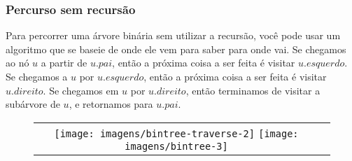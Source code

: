 \documentclass{beamer}
\begin{document}
\begin{frame}
\frametitle{Percurso sem recursão}
Para percorrer uma árvore binária sem utilizar a recursão, você pode usar um algoritmo que
se baseie de onde ele vem para saber para onde vai.  Se chegamos ao nó \ensuremath{\ensuremath{\ensuremath{\mathit{u}}}} a partir de \ensuremath{\ensuremath{\ensuremath{\mathit{u}}.\ensuremath{\mathit{pai}}}},
então a próxima coisa a ser feita é visitar \ensuremath{\ensuremath{\ensuremath{\mathit{u}}.\ensuremath{\mathit{esquerdo}}}}.  Se chegamos a \ensuremath{\ensuremath{\ensuremath{\mathit{u}}}}
por \ensuremath{\ensuremath{\ensuremath{\mathit{u}}.\ensuremath{\mathit{esquerdo}}}}, então a próxima coisa a ser feita é visitar \ensuremath{\ensuremath{\ensuremath{\mathit{u}}.\ensuremath{\mathit{direito}}}}.  Se chegamos 
em \ensuremath{\ensuremath{\ensuremath{\mathit{u}}}} por \ensuremath{\ensuremath{\ensuremath{\mathit{u}}.\ensuremath{\mathit{direito}}}}, então terminamos de visitar a subárvore de \ensuremath{\ensuremath{\ensuremath{\mathit{u}}}},
e retornamos para \ensuremath{\ensuremath{\ensuremath{\mathit{u}}.\ensuremath{\mathit{pai}}}}.
\begin{figure}
  \begin{center}
    \begin{tabular}{cc}
      \texttt{[image: imagens/bintree-traverse-2]}
      \texttt{[image: imagens/bintree-3]}
    \end{tabular}
  \end{center}
\end{figure}
\end{frame}
\end{document}
